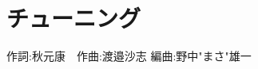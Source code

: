 \section{チューニング}

\begin{center}
    \scriptsize{
        作詞:秋元康　作曲:渡邉沙志	編曲:野中"まさ"雄一
    }
\end{center}

\vspace{0.7em}

\begin{Parallel}[c]{0.47\textwidth}{0.47\textwidth}

\ParallelLText{
    \footnotesize{
        
    }
}

\ParallelRText{
    \footnotesize{
        
    }
}

\end{Parallel}
